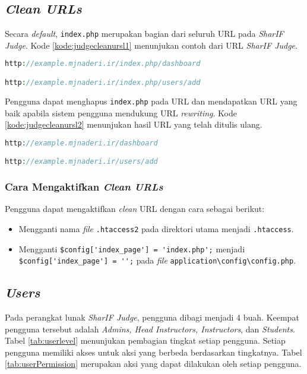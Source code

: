 \begin{enumerate}
\end{enumerate}

\subsection{\textit{Clean URLs}}
\label{sec:cleanurls}
Secara \textit{default}, \verb|index.php| merupakan bagian dari seluruh URL pada \textit{SharIF Judge}. Kode \ref{kode:judgecleanursl1} menunjukan contoh dari URL \textit{SharIF Judge}.

\begin{lstlisting}[language=PHP, caption=Contoh URL \textit{SharIF Judge}, label=kode:judgecleanursl1]
http://example.mjnaderi.ir/index.php/dashboard

http://example.mjnaderi.ir/index.php/users/add
\end{lstlisting}

Pengguna dapat menghapus \verb|index.php| pada URL dan mendapatkan URL yang baik apabila sistem pengguna mendukung URL \textit{rewriting}. Kode \ref{kode:judgecleanursl2} menunjukan hasil URL yang telah ditulis ulang.

\begin{lstlisting}[language=PHP, caption=Contoh hasil URL \textit{SharIF Judge} yang telah ditulis ulang, label=kode:judgecleanursl2]
http://example.mjnaderi.ir/dashboard

http://example.mjnaderi.ir/users/add
\end{lstlisting}

\subsubsection{Cara Mengaktifkan \textit{Clean URLs}}
Pengguna dapat mengaktifkan \textit{clean} URL dengan cara sebagai berikut:
\begin{itemize}
\item Mengganti nama \textit{file} \verb|.htaccess2| pada direktori utama menjadi \verb|.htaccess|.
\item Mengganti \verb|$config['index_page'] = 'index.php';| menjadi \verb|$config['index_page'] = '';| pada \textit{file} \verb|application\config\config.php|.
\end{itemize}

\subsection{\textit{Users}}
\label{sec:users}
Pada perangkat lunak \textit{SharIF Judge}, pengguna dibagi menjadi 4 buah. Keempat pengguna tersebut adalah \textit{Admins, Head Instructors, Instructors}, dan\textit{ Students}. Tabel \ref{tab:userlevel} menunjukan pembagian tingkat setiap pengguna. Setiap pengguna memiliki akses untuk aksi yang berbeda berdasarkan tingkatnya. Tabel \ref{tab:userPermission} merupakan aksi yang dapat dilakukan oleh setiap pengguna.

